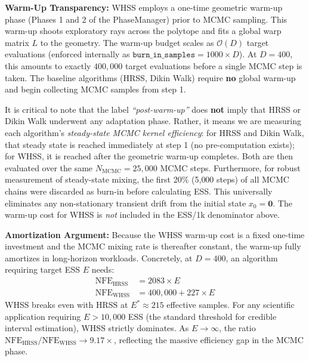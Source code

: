 \documentclass[12pt]{article}
\begin{document}
\textbf{Warm-Up Transparency:} WHSS employs a one-time geometric warm-up phase (Phases 1 and 2 of the PhaseManager) prior to MCMC sampling. This warm-up shoots exploratory rays across the polytope and fits a global warp matrix $L$ to the geometry. The warm-up budget scales as $\mathcal{O}(D)$ target evaluations (enforced internally as $\texttt{burn\_in\_samples} = 1000 \times D$). At $D=400$, this amounts to exactly $400{,}000$ target evaluations before a single MCMC step is taken. The baseline algorithms (HRSS, Dikin Walk) require \textbf{no} global warm-up and begin collecting MCMC samples from step 1.

It is critical to note that the label \emph{``post-warm-up''} does \textbf{not} imply that HRSS or Dikin Walk underwent any adaptation phase. Rather, it means we are measuring each algorithm's \emph{steady-state MCMC kernel efficiency}: for HRSS and Dikin Walk, that steady state is reached immediately at step 1 (no pre-computation exists); for WHSS, it is reached after the geometric warm-up completes. Both are then evaluated over the same $N_{\text{MCMC}} = 25{,}000$ MCMC steps. Furthermore, for robust measurement of steady-state mixing, the first 20\% (5{,}000 steps) of all MCMC chains were discarded as burn-in before calculating ESS. This universally eliminates any non-stationary transient drift from the initial state $x_0 = \mathbf{0}$. The warm-up cost for WHSS is \emph{not} included in the ESS/1k denominator above.

\textbf{Amortization Argument:} Because the WHSS warm-up cost is a fixed one-time investment and the MCMC mixing rate is thereafter constant, the warm-up fully amortizes in long-horizon workloads. Concretely, at $D=400$, an algorithm requiring target ESS $E$ needs:
\begin{align*}
\text{NFE}_{\text{HRSS}} &= 2083 \times E \\
\text{NFE}_{\text{WHSS}} &= 400{,}000 + 227 \times E
\end{align*}
WHSS breaks even with HRSS at $E^* \approx 215$ effective samples. For any scientific application requiring $E > 10{,}000$ ESS (the standard threshold for credible interval estimation), WHSS strictly dominates. As $E \to \infty$, the ratio $\text{NFE}_{\text{HRSS}} / \text{NFE}_{\text{WHSS}} \to 9.17\times$, reflecting the massive efficiency gap in the MCMC phase.
\end{document}

